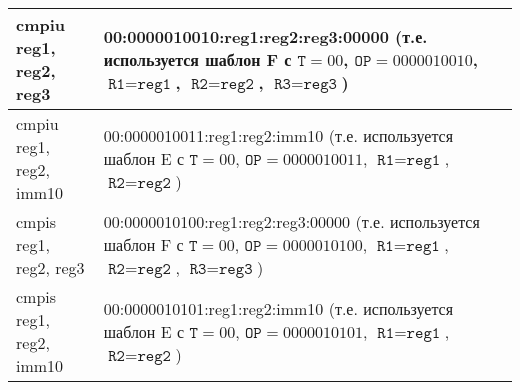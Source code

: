 \documentclass[10pt]{report}
\begin{document}
\begin{longtable}[c]{|l|p{12.5cm}|}
cmpiu reg1, reg2, reg3           & 00:0000010010:reg1:reg2:reg3:00000 (т.е. используется шаблон F с $\texttt{T}=00$, $\texttt{OP}=0000010010$, $\texttt{R1}=\texttt{reg1}$, $\texttt{R2}=\texttt{reg2}$,  $\texttt{R3}=\texttt{reg3}$) \\ \hline
cmpiu reg1, reg2, imm10          & 00:0000010011:reg1:reg2:imm10 (т.е. используется шаблон E с $\texttt{T}=00$, $\texttt{OP}=0000010011$, $\texttt{R1}=\texttt{reg1}$, $\texttt{R2}=\texttt{reg2}$) \\ \hline
cmpis reg1, reg2, reg3           & 00:0000010100:reg1:reg2:reg3:00000 (т.е. используется шаблон F с $\texttt{T}=00$, $\texttt{OP}=0000010100$, $\texttt{R1}=\texttt{reg1}$, $\texttt{R2}=\texttt{reg2}$,  $\texttt{R3}=\texttt{reg3}$) \\ \hline
cmpis reg1, reg2, imm10          & 00:0000010101:reg1:reg2:imm10 (т.е. используется шаблон E с $\texttt{T}=00$, $\texttt{OP}=0000010101$, $\texttt{R1}=\texttt{reg1}$, $\texttt{R2}=\texttt{reg2}$) \\ \hline
\end{longtable} 
    
\end{document}
